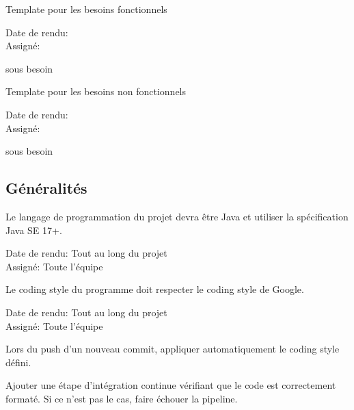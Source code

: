 \documentclass{article}
\begin{document}
\begin{needbox}[F?: Titre]
    Template pour les besoins fonctionnels
    \begin{duedatebox}
        Date de rendu:\\
        Assigné:
    \end{duedatebox}
    \begin{subneedbox}[F?.?: Titre]
        sous besoin 
    \end{subneedbox}
\end{needbox}

\begin{nonfunctionnalneedbox}[F?: Titre]
    Template pour les besoins non fonctionnels
    \begin{duedatebox}
        Date de rendu:\\
        Assigné:
    \end{duedatebox}
    \begin{subneedbox}[F?.?: Titre]
        sous besoin
    \end{subneedbox}
\end{nonfunctionnalneedbox}

\subsection{Généralités}

\begin{nonfunctionnalneedbox}
    Le langage de programmation du projet devra être Java et utiliser la spécification Java SE 17+.
    \begin{duedatebox}
        Date de rendu: Tout au long du projet\\
        Assigné: Toute l'équipe
    \end{duedatebox}
\end{nonfunctionnalneedbox}

\begin{nonfunctionnalneedbox}
    Le coding style du programme doit respecter le coding style de Google.
    \begin{duedatebox}
        Date de rendu: Tout au long du projet\\
        Assigné: Toute l'équipe
    \end{duedatebox}
    \begin{subneedbox}
        Lors du push d'un nouveau commit, appliquer automatiquement le coding style défini.
    \end{subneedbox}
    \begin{subneedbox}
        Ajouter une étape d'intégration continue vérifiant que le code est correctement formaté.
        Si ce n'est pas le cas, faire échouer la pipeline.
    \end{subneedbox}
\end{nonfunctionnalneedbox}
\end{document}

